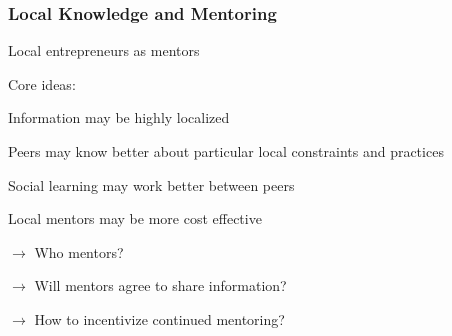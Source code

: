 \documentclass[hideothersubsections, usenames,dvipsnames,11pt]{beamer}
\newenvironment{itemize_2pt}{\itemize\addtolength{\itemsep}{2pt}}{\enditemize}
\begin{document}
\begin{frame}
\frametitle{Local Knowledge and Mentoring}

Local entrepreneurs as mentors

\begin{itemize_2pt}

	\item Core ideas: 
	\begin{itemize_2pt}
		\item \textcolor{bdf}{Information may be highly localized}
		\item \textcolor{bdf}{Peers may know better} about particular local constraints and practices
		\item \textcolor{bdf}{Social learning} may work better between peers
		\item Local mentors may be more \textcolor{bdf}{cost effective}
	\end{itemize_2pt}
	
	\item[] $\rightarrow$ Who mentors?
	\item[] $\rightarrow$ Will mentors agree to share information?
	\item[] $\rightarrow$ How to incentivize continued mentoring?
		
\end{itemize_2pt}
\end{frame}
\end{document}
